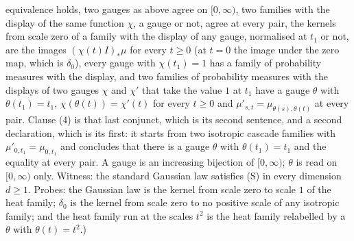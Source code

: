 \begin{theorem}
{equivalence holds, two gauges as above agree on $[0,\infty)$, two families with the display of
the same function $\chi$, a gauge or not, agree at every pair, the kernels from scale zero of a
family with the display of any gauge, normalised at $t_1$ or not, are the images
$(\chi(t)I)_*\mu$ for every $t \ge 0$ (at $t = 0$ the image under the zero
map, which is $\delta_0$), every gauge with $\chi(t_1) = 1$ has a family of probability
measures with the display, and two families of probability measures with the displays of two
gauges $\chi$ and $\chi'$ that take the value $1$ at $t_1$ have a gauge $\theta$ with
$\theta(t_1) = t_1$, $\chi(\theta(t)) = \chi'(t)$ for every $t \ge 0$ and
$\mu'_{s,t} = \mu_{\theta(s),\theta(t)}$ at every pair. Clause (4) is that last conjunct, which
is its second sentence, and a second declaration, which is its first: it starts from two
isotropic cascade families with $\mu'_{0,t_1} = \mu_{0,t_1}$ and concludes that there is a
gauge $\theta$ with $\theta(t_1) = t_1$ and the equality at every pair. A gauge is an increasing
bijection of $[0,\infty)$; $\theta$ is read on $[0,\infty)$ only. Witness: the standard Gaussian
law satisfies (S) in every dimension
$d \ge 1$. Probes: the Gaussian law is the kernel from scale zero to scale $1$ of the heat
family; $\delta_0$ is the kernel from scale zero to no positive scale of any isotropic
family; and the heat family run at the scales $t^2$ is the heat family relabelled by a $\theta$
with $\theta(t) = t^2$.)}
\end{theorem}


